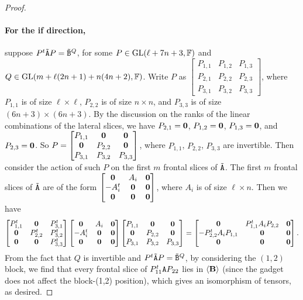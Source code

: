 \documentclass[11pt]{article}
\begin{document}
\begin{proof}
\paragraph{For the if direction,} suppose  
$P^t\tilde{\mathtt{A}} P=\tilde{\mathtt{B}}^Q$, for some $P\in 
\mathrm{GL}(\ell+7n+3, \mathbb{F})$ and $Q\in \mathrm{GL}(m+\ell(2n+1)+n(4n+2), \mathbb{F})$. Write $P$ as 
$\begin{bmatrix} P_{1,1} & P_{1,2} & P_{1,3} \\ P_{2,1} & P_{2,2} & P_{2,3} \\ 
P_{3,1} & P_{3,2} & P_{3,3}\end{bmatrix}$, where $P_{1,1}$ is of size $\ell\times 
\ell$, $P_{2,2}$ is of size $n\times n$, and $P_{3,3}$ is of size $(6n+3)\times 
(6n+3)$. By the discussion on the ranks of the linear combinations of the 
lateral slices, we have $P_{2,1}=\mathbf{0}$, 
$P_{1,2}=\mathbf{0}$, $P_{1,3}=\mathbf{0}$, and $P_{2,3}=\mathbf{0}$. So $P=\begin{bmatrix} 
P_{1,1} & \mathbf{0} & \mathbf{0} \\ \mathbf{0} & P_{2,2} & \mathbf{0} \\ P_{3,1} & P_{3,2} & 
P_{3,3}\end{bmatrix}$, where $P_{1,1}$, $P_{2,2}$, $P_{3,3}$ are invertible. 
Then consider the action of such $P$ on the first $m$ frontal slices of $\tilde{\mathtt{A}}$. 
The first $m$ frontal slices of $\tilde{\mathtt{A}}$ are of the form 
$\begin{bmatrix}
\mathbf{0} & A_i & \mathbf{0} \\
-A_i^t & \mathbf{0} & \mathbf{0} \\
\mathbf{0} & \mathbf{0} & \mathbf{0} 
\end{bmatrix}$, where $A_i$ is of size $\ell\times n$. 
Then we have 
$$
\begin{bmatrix} 
P_{1,1}^t & \mathbf{0} & P_{3,1}^t \\ 
\mathbf{0} & P_{2,2}^t & P_{3,2}^t \\
\mathbf{0} & \mathbf{0} & P_{3,3}^t
\end{bmatrix}
\begin{bmatrix}
\mathbf{0} & A_i & \mathbf{0} \\
-A_i^t & \mathbf{0} & \mathbf{0} \\
\mathbf{0} & \mathbf{0} & \mathbf{0} 
\end{bmatrix}
\begin{bmatrix} 
P_{1,1} & \mathbf{0} & \mathbf{0} \\ 
\mathbf{0} & P_{2,2} & \mathbf{0} \\ 
P_{3,1} & P_{3,2} & P_{3,3}
\end{bmatrix}
=
\begin{bmatrix}
\mathbf{0} & P_{1,1}^tA_iP_{2,2} & \mathbf{0} \\
-P_{2,2}^tA_iP_{1,1} & \mathbf{0} & \mathbf{0} \\
\mathbf{0} & \mathbf{0} & \mathbf{0}
\end{bmatrix}.
$$
From the fact that $Q$ is invertible and $P^t \tilde{\mathtt{A}} P = \tilde {\mathtt{B}}^Q$, by 
considering the $(1,2)$ block, we find that 
every frontal slice of 
$P_{11}^t\mathtt{A} P_{22}$ lies in $\langle \mathbf{B}\rangle$ 
(since the gadget does not affect the block-(1,2) position), 
which gives an isomorphism of tensors, as desired.


\end{proof}
\end{document}
